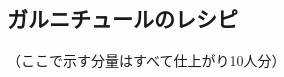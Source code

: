 \href{✓原稿下準備なし}{} \href{訳と注釈\%2020180420進行中}{}
\href{未、原文対照チェック}{} \href{未、日本語表現校正}{}
\href{未、注釈チェク}{} \href{未、原稿最終校正}{}

\begin{Main}

\hypertarget{garnitures-recettes}{%
\subsection{ガルニチュールのレシピ}\label{garnitures-recettes}}


\begin{center}
\medlarge（ここで示す分量はすべて仕上がり10人分）
\end{center}
\normalsize

\end{Main}

